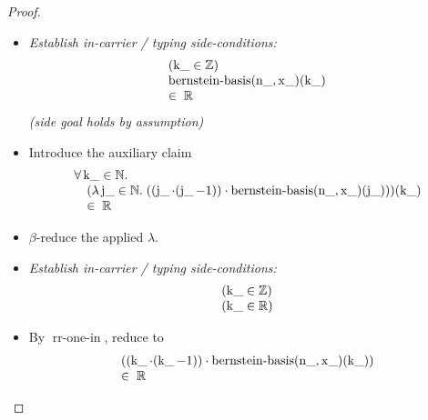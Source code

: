\documentclass[11pt]{article}
\theoremstyle{plain}
\begin{document}
\begin{proof}
\begin{itemize}[leftmargin=2.8em, itemsep=4pt, parsep=1pt]
  \item[\textbf{14--17}] \emph{Establish in-carrier / typing side-conditions:}
\begin{equation*}
\begin{array}{@{}l@{}}
(\operatorname{k\_} \in \mathbb{Z}) \\
\begin{array}{@{}l@{}} \operatorname{bernstein\text{-}basis}(\operatorname{n\_}, \operatorname{x\_})(\operatorname{k\_}) \\ \in\; \mathbb{R} \end{array}
\end{array}
\end{equation*}
  \emph{(side goal holds by assumption)}
  \item[\textbf{18}] Introduce the auxiliary claim
\begin{equation*}
\begin{array}{@{}l@{}} \forall \operatorname{k\_} \in \mathbb{N}. \\ \quad (\lambda \operatorname{j\_} \in \mathbb{N}.\; ((\operatorname{j\_} \cdot (\operatorname{j\_} - 1)) \cdot \operatorname{bernstein\text{-}basis}(\operatorname{n\_}, \operatorname{x\_})(\operatorname{j\_})))(\operatorname{k\_}) \\ \quad \in\; \mathbb{R} \end{array}
\end{equation*}

  \item[\textbf{19--20}] $\beta$-reduce the applied $\lambda$.
  \item[\textbf{21--22}] \emph{Establish in-carrier / typing side-conditions:}
\begin{equation*}
\begin{array}{@{}l@{}}
(\operatorname{k\_} \in \mathbb{Z}) \\
(\operatorname{k\_} \in \mathbb{R})
\end{array}
\end{equation*}

  \item[\textbf{23}] By $\operatorname{rr\text{-}one\text{-}in}$, reduce to
\begin{equation*}
\begin{array}{@{}l@{}} ((\operatorname{k\_} \cdot (\operatorname{k\_} - 1)) \cdot \operatorname{bernstein\text{-}basis}(\operatorname{n\_}, \operatorname{x\_})(\operatorname{k\_})) \\ \in\; \mathbb{R} \end{array}
\end{equation*}


\end{itemize}
\end{proof}
\end{document}
